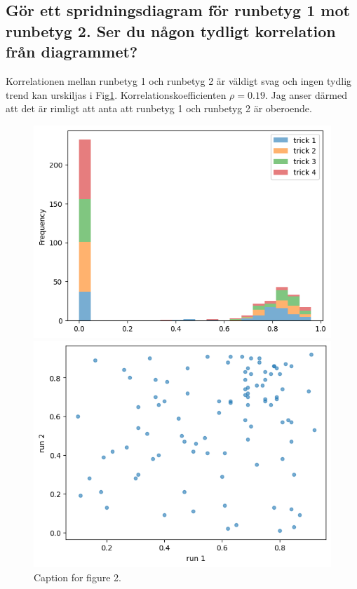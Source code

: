\documentclass{article}
\begin{document}
\subsection{Gör ett spridningsdiagram för runbetyg 1 mot runbetyg 2. Ser du någon tydligt korrelation från diagrammet?} \label{sec:1e}

Korrelationen mellan runbetyg 1 och runbetyg 2 är väldigt svag och ingen tydlig trend kan urskiljas i Fig\ref{fig:1e}.
Korrelationskoefficienten $\rho = 0.19$. Jag anser därmed att det är rimligt att anta att runbetyg 1 och runbetyg 2 är oberoende.

\clearpage  %

\begin{figure}[H]
    \centering
    
    \begin{minipage}{0.45\textwidth}
        \centering
        \includegraphics[width=\textwidth]{Figures/1b.png}
        \caption{Histogram för trickbetyg 1-4.}
        \label{fig:1b}
    \end{minipage}
    \hfill
    \begin{minipage}{0.45\textwidth}
        \centering
        \includegraphics[width=\textwidth]{Figures/1e.png}
        \caption{Caption for figure 2.}
        \label{fig:1e}
    \end{minipage}
    
\end{figure}
\end{document}
